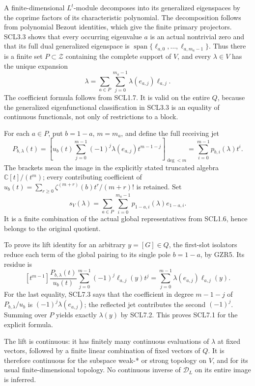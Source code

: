 A finite-dimensional \(L^t\)-module decomposes into its generalized
eigenspaces by the coprime factors of its characteristic polynomial. The
decomposition follows from polynomial Bezout identities, which give the
finite primary projectors. SCL3.3 shows that every occurring eigenvalue
\(a\) is an actual nontrivial zero and that its full dual generalized
eigenspace is
\(\operatorname{span}\{\ell_{a,0},\ldots,\ell_{a,m_a-1}\}\). Thus there
is a finite set \(P\subset\mathscr Z\) containing the complete support
of \(V\), and every \(\lambda\in V\) has the unique expansion \[
 \lambda=\sum_{a\in P}\sum_{j=0}^{m_a-1}
            \lambda(e_{a,j})\ell_{a,j}.
 \tag{SCL7.2}
\] The coefficient formula follows from SCL1.7. It is valid on the
entire \(Q\), because the generalized eigenfunctional classification in
SCL3.3 is an equality of continuous functionals, not only of
restrictions to a block.

For each \(a\in P\), put \(b=1-a\), \(m=m_a\), and define the full
receiving jet \[
 P_{b,\lambda}(t)=
 \left[
 u_b(t)\sum_{j=0}^{m-1}
   (-1)^j\lambda(e_{a,j})t^{m-1-j}
 \right]_{\deg<m}
 =\sum_{i=0}^{m-1}p_{b,i}(\lambda)t^i.
 \tag{SCL7.3}
\] The brackets mean the image in the explicitly stated truncated
algebra \(\mathbb C[t]/(t^m)\); every contributing coefficient of
\(u_b(t)=\sum_{r\ge0}\zeta^{(m+r)}(b)t^r/(m+r)!\) is retained. Set \[
 \boxed{
 s_V(\lambda)=\sum_{a\in P}\sum_{i=0}^{m_a-1}
                   p_{1-a,i}(\lambda)e_{1-a,i}.}
 \tag{SCL7.4}
\] It is a finite combination of the actual global representatives from
SCL1.6, hence belongs to the original quotient.

To prove its lift identity for an arbitrary \(y=[G]\in Q\), the
first-slot isolators reduce each term of the global pairing to its
single pole \(b=1-a\), by GZR5. Its residue is \[
 [t^{m-1}]
 \frac{P_{b,\lambda}(t)}{u_b(t)}
       \sum_{j=0}^{m-1}(-1)^j\ell_{a,j}(y)t^j
 =\sum_{j=0}^{m-1}\lambda(e_{a,j})\ell_{a,j}(y).
\] For the last equality, SCL7.3 says that the coefficient in degree
\(m-1-j\) of \(P_{b,\lambda}/u_b\) is \((-1)^j\lambda(e_{a,j})\); the
reflected jet contributes the second \((-1)^j\). Summing over \(P\)
yields exactly \(\lambda(y)\) by SCL7.2. This proves SCL7.1 for the
explicit formula.

The lift is continuous: it has finitely many continuous evaluations of
\(\lambda\) at fixed vectors, followed by a finite linear combination of
fixed vectors of \(Q\). It is therefore continuous for the subspace
weak-* or strong topology on \(V\), and for its usual finite-dimensional
topology. No continuous inverse of \(\mathcal D_L\) on its entire image
is inferred.

